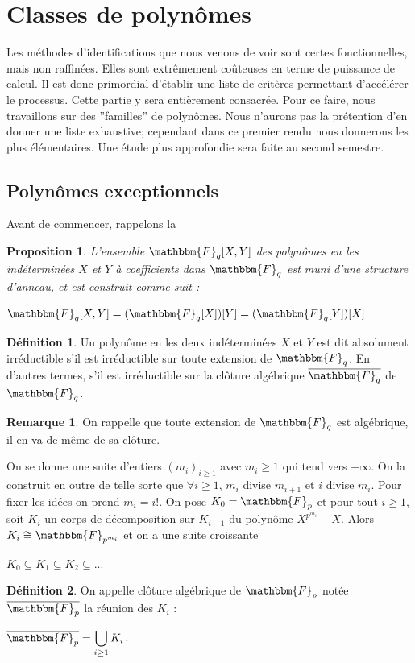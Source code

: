 \documentclass[12pt]{article}
\newcommand{\Fq}{\mathbbm{F}_q}
\newtheorem{prop}{Proposition}
\theoremstyle{definition}
\newtheorem{definition}{Définition}
\newtheorem{rem}{Remarque}
\begin{document}
\pagebreak

\section{Classes de polynômes}
Les méthodes d'identifications que nous venons de voir sont certes fonctionnelles, mais non raffinées. Elles sont extrêmement coûteuses en terme de puissance de calcul. Il est donc primordial d'établir une liste de critères permettant d'accélérer le processus. Cette partie y sera entièrement consacrée. Pour ce faire, nous travaillons sur des ''familles'' de polynômes. Nous n'aurons pas la prétention d'en donner une liste exhaustive; cependant dans ce premier rendu nous donnerons les plus élémentaires. Une étude plus approfondie sera faite au second semestre.

\subsection{Polynômes exceptionnels}
Avant de commencer, rappelons la 

\begin{prop}
L'ensemble $\Fq[X,Y]$ des polynômes en les indéterminées $X$ et $Y$ à coefficients dans $\Fq$ est muni d'une structure d'anneau, et est construit comme suit :
\begin{center} $\Fq[X,Y] = (\Fq[X])[Y] = (\Fq[Y])[X]$ \end{center}
\end{prop}

\begin{definition}
Un polynôme en les deux indéterminées $X$ et $Y$ est dit absolument irréductible s'il est irréductible sur toute extension de $\Fq$. En d'autres termes, s'il est irréductible sur la clôture algébrique $\overline{\Fq}$ de $\Fq$. 

\begin{rem}
On rappelle que toute extension de $\Fq$ est algébrique, il en va de même de sa clôture.
\end{rem}

\end{definition}
On se donne une suite d'entiers $(m_i)_{i \geq 1}$ avec $m_i \geq 1$ qui tend vers $+ \infty$. On la construit en outre de telle sorte que $\forall i \geq 1$, $m_i$ divise $m_{i+1}$ et $i$ divise $m_i$. Pour fixer les idées on prend $m_i = i !$. On pose $K_0 = \mathbbm{F}_p$ et pour tout $i \geq 1$, soit $K_i$ un corps de décomposition sur $K_{i-1}$ du polynôme $X^{p^{m_i}} - X$. Alors $K_i \cong \mathbbm{F}_{p^{m_i}}$ et on a une suite croissante
\begin{center}
$K_0 \subseteq K_1 \subseteq K_2 \subseteq ...$
\end{center}
\begin{definition}
On appelle clôture algébrique de $\mathbbm{F}_p$ notée $\overline{\mathbbm{F}_p}$ la réunion des $K_i$ :
\begin{center}
$\overline{\mathbbm{F}_p} = \displaystyle \bigcup_{i \geq 1} K_i$.
\end{center}
\end{definition}
\end{document}
